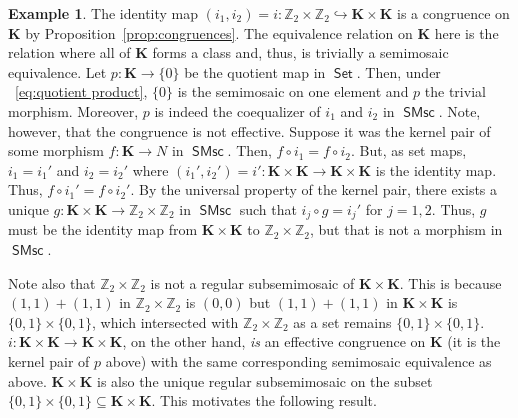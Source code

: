 \documentclass[reqno]{amsart}
\newcommand{\cat}[1]{\ensuremath{\mathsf{#1}}}
\DeclareMathOperator{\Set}{\cat{Set}}
\DeclareMathOperator{\SMsc}{\cat{SMsc}}
\newcommand{\Z}{\mathbb{Z}}
\newcommand{\K}{\mathbf{K}}
\numberwithin{equation}{section}
\theoremstyle{plain}
\theoremstyle{definition}
\newtheorem{example}[equation]{Example}
\begin{document}
\begin{example}
    The identity map $(i_1, i_2)=i:\Z_2\times \Z_2 \hookrightarrow \K\times \K$ is a congruence on $\K$ by Proposition~\ref{prop:congruences}. The equivalence relation on $\K$ here is the relation where all of $\K$ forms a class and, thus, is trivially a semimosaic equivalence. Let $p:\K\to \{0\}$ be the quotient map in $\Set$. Then, under ~\eqref{eq:quotient product}, $\{0\}$ is the semimosaic on one element and $p$ the trivial morphism. Moreover, $p$ is indeed the coequalizer of $i_1$ and $i_2$ in $\SMsc$. Note, however, that the congruence is not effective. Suppose it was the kernel pair of some morphism $f:\K\to N$ in $\SMsc$. Then, $f\circ i_1 = f\circ i_2$. But, as set maps, $i_1=i_1'$ and $i_2=i_2'$ where $(i_1', i_2')=i':\K\times \K \to \K\times \K$ is the identity map. Thus, $f\circ i_1' = f\circ i_2'$. By the universal property of the kernel pair, there exists a unique $g:\K\times \K \to \Z_2\times \Z_2$ in $\SMsc$ such that $i_j\circ g = i_j'$ for $j=1, 2$. Thus, $g$ must be the identity map from $\K\times \K$ to $\Z_2\times \Z_2$, but that is not a morphism in $\SMsc$. 
    
     Note also that $\Z_2 \times \Z_2$ is not a regular subsemimosaic of $\K \times \K$. This is because $(1, 1)+(1,1)$ in $\Z_2\times \Z_2$ is  $(0, 0)$ but $(1, 1)+ (1,1)$ in $\K\times \K$ is $\{0, 1\}\times \{0, 1\}$, which intersected with $\Z_2\times \Z_2$ as a set remains $\{0, 1\} \times \{0, 1\}$. $i:\K\times \K \to \K\times \K$, on the other hand, \textit{is} an effective congruence on $\K$ (it is the kernel pair of $p$ above) with the same corresponding semimosaic equivalence as above. $\K\times \K$ is also the unique regular subsemimosaic on the subset $\{0, 1\} \times \{0, 1\} \subseteq \K\times \K$. This motivates the following result.        
     \end{example}
\end{document}

